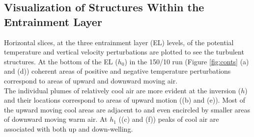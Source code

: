 


\clearpage

\subsection{Visualization of Structures Within the Entrainment Layer}
\FloatBarrier

Horizontal slices, at the three entrainment layer (\acs{EL}) levels, of the potential temperature 
and vertical velocity perturbations are plotted to see the turbulent structures.  At the bottom of the \acs{EL} ($h_{0}$) 
in the 150/10 run (Figure \ref{fig:conts} (a) and (d)) coherent areas of positive and negative temperature perturbations 
correspond to areas of upward and downward moving air.\\

The individual plumes of relatively cool air are more evident at the inversion ($h$) and their 
locations correspond to areas of upward motion ((b) and (e)).  Most of the upward moving cool areas are adjacent to and even 
encircled by smaller areas of downward moving warm air.  At $h_{1}$ ((c) and (f)) peaks of cool air are associated 
with both up and down-welling.\\  

